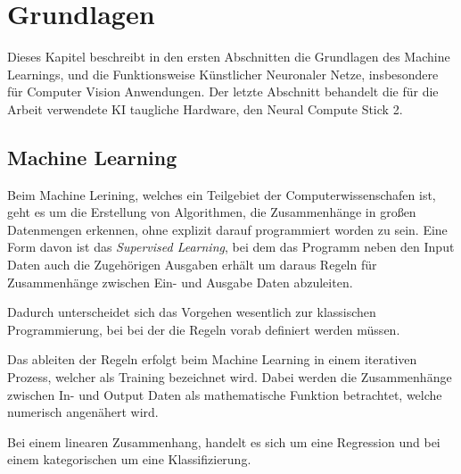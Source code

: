 \chapter{Grundlagen}\label{kap:grundlagen}


Dieses Kapitel beschreibt in den ersten Abschnitten die Grundlagen 
des Machine Learnings, und die Funktionsweise Künstlicher Neuronaler Netze,
insbesondere für Computer Vision Anwendungen.
Der letzte Abschnitt behandelt die für die Arbeit verwendete KI taugliche 
Hardware, den Neural Compute Stick 2.




\section{Machine Learning}\label{sec:ml}

Beim Machine Lerining, welches ein Teilgebiet der Computerwissenschafen
ist, geht es um die Erstellung von Algorithmen, die Zusammenhänge in großen
Datenmengen erkennen, ohne explizit darauf programmiert worden zu sein.
Eine Form davon ist das \textit{Supervised Learning}, bei dem das Programm 
neben den Input Daten auch die Zugehörigen Ausgaben erhält um daraus 
Regeln für Zusammenhänge zwischen Ein- und Ausgabe Daten abzuleiten.

Dadurch unterscheidet sich das Vorgehen wesentlich zur klassischen Programmierung,
bei bei der die Regeln vorab definiert werden müssen.


\vspace{0.5cm}
\begin{figure}[H]
    \centering
    \def\svgwidth{0.8\columnwidth}
    \footnotesize
    
\end{figure}
\vspace{0.5cm}



Das ableiten der Regeln erfolgt beim Machine Learning in einem 
iterativen Prozess, welcher als Training bezeichnet wird.
Dabei werden die Zusammenhänge zwischen In- und Output Daten 
als mathematische Funktion betrachtet, welche numerisch 
angenähert wird.

Bei einem linearen Zusammenhang, handelt es sich
um eine Regression und bei einem kategorischen um 
eine Klassifizierung.

